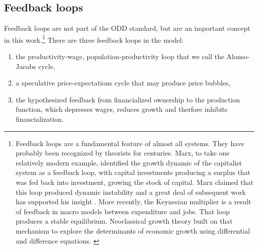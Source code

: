 \subsection{Feedback loops}
Feedback loops are not part of the ODD standard, but are an important concept in this work.\footnote{Feedback loops are a fundamental feature of almost all systems. They have probably been recognized by theorists for centuries. Marx, to take one relatively modern example, identified the growth dynamic of the capitalist system as a feedback loop, with capital investments producing a surplus that was fed back into investment, growing the stock of capital. Marx claimed that this loop produced dynamic instability and a great deal of subsequent work has supported his insight \cite{dumenilStabilityInstabilityDynamic1986} \cite{schumpeterInstabilityCapitalism1928}. More recently, the Keynesian multiplier is a result of feedback in macro models between expenditure and jobs. That loop produces a stable equilibrium. Neoclassical growth theory built on that mechanism to explore the determinants of economic growth using differential and difference equations. \cite{radzickiIntroductionFeedbackEconomics}} 
There are three \glspl{feedback loop} in the model: 
\begin{enumerate}
    \item the productivity-wage, population-productivity loop that we call the Alonso-Jacobs cycle,
    \item a speculative price-expectations cycle that may produce price bubbles, 
    \item the hypothesized feedback from financialized ownership to the production function, which depresses wages, reduces growth and therfore inhibits financialization.
 
\end{enumerate}


